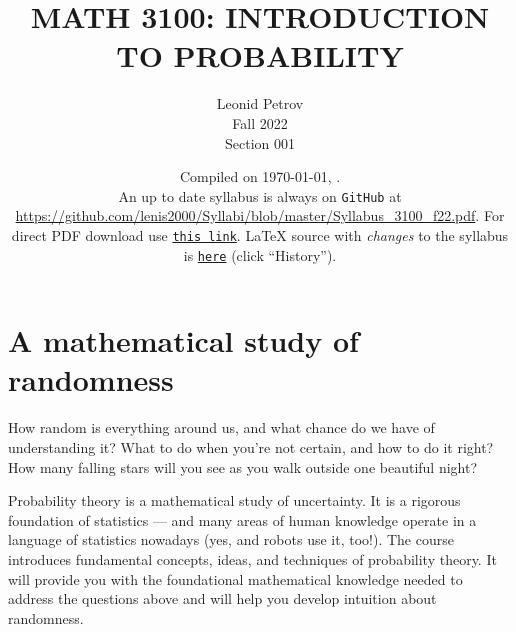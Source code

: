 \documentclass[oneside,11pt]{amsart}
\begin{document}
\title[MATH 3100: INTRODUCTION TO PROBABILITY]{MATH 3100: INTRODUCTION TO PROBABILITY}
\author{Leonid Petrov\\Fall 2022\\Section 001}
\date{Compiled on \today, \currenttime.\\An up to date syllabus is always on \texttt{GitHub} at \url{https://github.com/lenis2000/Syllabi/blob/master/Syllabus_3100_f22.pdf}. For direct PDF download use \href{https://github.com/lenis2000/Syllabi/raw/master/Syllabus_3100_f22.pdf}{\texttt{this link}}.
	\LaTeX{} source with \textit{changes} to the syllabus is \href{https://github.com/lenis2000/Syllabi/blob/master/Syllabus_3100_f22.tex}{\texttt{here}}
(click ``History'').}
\maketitle

\bigskip

\section{A mathematical study of randomness}

How random is everything around us, and what chance do we have of understanding it? What to do when you're not certain, and how to do it right? How many falling stars will you see as you walk outside one beautiful night? 

Probability theory is a mathematical study of uncertainty. It is a rigorous foundation of statistics --- and many areas of human knowledge operate in a language of statistics nowadays (yes, and robots use it, too!). The course introduces fundamental concepts, ideas, and techniques of probability theory. It will provide you with the foundational mathematical knowledge needed to address the questions above and will help you develop intuition about randomness.
\end{document}

